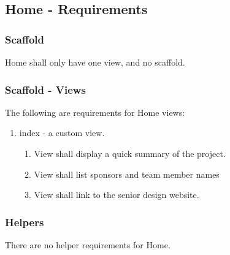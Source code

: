 \subsection{Home - Requirements}
\label{sec:document_spec} 

\subsubsection{Scaffold}
Home shall only have one view, and no scaffold.

\subsubsection{Scaffold - Views}
The following are requirements for Home views:
\begin{enumerate}
	\item index - a custom view.
	\begin{enumerate}
		\item View shall display a quick summary of the project.
		\item View shall list sponsors and team member names
		\item View shall link to the senior design website.
	\end{enumerate}
\end{enumerate}


\subsubsection{Helpers}
There are no helper requirements for Home.

